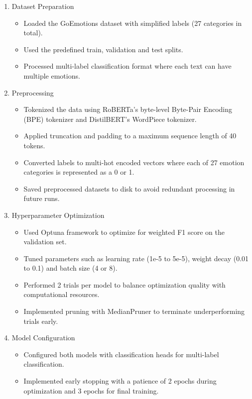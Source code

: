 \documentclass[titlepage]{article}
\begin{document}
\begin{enumerate}
    \item Dataset Preparation
        \begin{itemize}
            \item Loaded the GoEmotions dataset with simplified labels (27 categories in total).
            \item Used the predefined train, validation and test splits.
            \item Processed multi-label classification format where each text can have multiple emotions.
        \end{itemize}
    \item Preprocessing 
        \begin{itemize}
            \item Tokenized the data using RoBERTa's byte-level Byte-Pair Encoding (BPE) tokenizer and DistilBERT's WordPiece tokenizer.
            \item Applied truncation and padding to a maximum sequence length of 40 tokens.
            \item Converted labels to multi-hot encoded vectors where each of 27 emotion categories is represented as a 0 or 1.
            \item Saved preprocessed datasets to disk to avoid redundant processing in future runs.
        \end{itemize}
    \item Hyperparameter Optimization
        \begin{itemize}
            \item Used Optuna framework to optimize for weighted F1 score on the validation set.
            \item Tuned parameters such as learning rate (1e-5 to 5e-5), weight decay (0.01 to 0.1) and batch size (4 or 8).
            \item Performed 2 trials per model to balance optimization quality with computational resources.
            \item Implemented pruning with MedianPruner to terminate underperforming trials early.
        \end{itemize}
    \item Model Configuration 
        \begin{itemize}
            \item Configured both models with classification heads for multi-label classification.
            \item Implemented early stopping with a patience of 2 epochs during optimization and 3 epochs for final training.

\end{itemize}
\end{enumerate}
\end{document}
